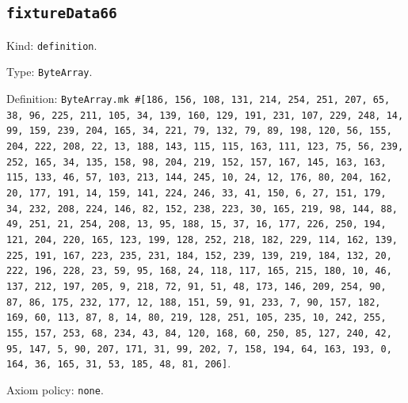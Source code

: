 \documentclass[11pt]{article}
\begin{document}
\subsection*{\texttt{fixtureData66}}
\noindent Kind: \texttt{definition}.\par
\noindent Type: \texttt{ByteArray}.\par
\noindent Definition: \texttt{ByteArray.mk \#[186, 156, 108, 131, 214, 254, 251, 207, 65, 38, 96, 225, 211, 105, 34, 139, 160, 129, 191, 231, 107, 229, 248, 14, 99, 159, 239, 204, 165, 34, 221, 79, 132, 79, 89, 198, 120, 56, 155, 204, 222, 208, 22, 13, 188, 143, 115, 115, 163, 111, 123, 75, 56, 239, 252, 165, 34, 135, 158, 98, 204, 219, 152, 157, 167, 145, 163, 163, 115, 133, 46, 57, 103, 213, 144, 245, 10, 24, 12, 176, 80, 204, 162, 20, 177, 191, 14, 159, 141, 224, 246, 33, 41, 150, 6, 27, 151, 179, 34, 232, 208, 224, 146, 82, 152, 238, 223, 30, 165, 219, 98, 144, 88, 49, 251, 21, 254, 208, 13, 95, 188, 15, 37, 16, 177, 226, 250, 194, 121, 204, 220, 165, 123, 199, 128, 252, 218, 182, 229, 114, 162, 139, 225, 191, 167, 223, 235, 231, 184, 152, 239, 139, 219, 184, 132, 20, 222, 196, 228, 23, 59, 95, 168, 24, 118, 117, 165, 215, 180, 10, 46, 137, 212, 197, 205, 9, 218, 72, 91, 51, 48, 173, 146, 209, 254, 90, 87, 86, 175, 232, 177, 12, 188, 151, 59, 91, 233, 7, 90, 157, 182, 169, 60, 113, 87, 8, 14, 80, 219, 128, 251, 105, 235, 10, 242, 255, 155, 157, 253, 68, 234, 43, 84, 120, 168, 60, 250, 85, 127, 240, 42, 95, 147, 5, 90, 207, 171, 31, 99, 202, 7, 158, 194, 64, 163, 193, 0, 164, 36, 165, 31, 53, 185, 48, 81, 206]}.\par
\noindent Axiom policy: \texttt{none}.\par
\end{document}
